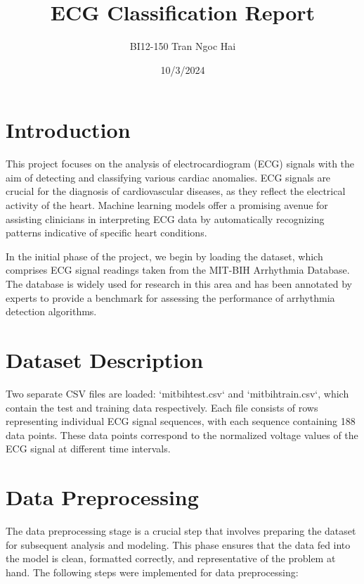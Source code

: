 \documentclass{report}
\title{ECG Classification Report}
\author{BI12-150 Tran Ngoc Hai}
\date{10/3/2024}
\begin{document}

\section{Introduction}

This project focuses on the analysis of electrocardiogram (ECG) signals with the aim of detecting and classifying various cardiac anomalies. ECG signals are crucial for the diagnosis of cardiovascular diseases, as they reflect the electrical activity of the heart. Machine learning models offer a promising avenue for assisting clinicians in interpreting ECG data by automatically recognizing patterns indicative of specific heart conditions.

In the initial phase of the project, we begin by loading the dataset, which comprises ECG signal readings taken from the MIT-BIH Arrhythmia Database. The database is widely used for research in this area and has been annotated by experts to provide a benchmark for assessing the performance of arrhythmia detection algorithms.


\section{Dataset Description}

 Two separate CSV files are loaded: `mitbihtest.csv` and `mitbihtrain.csv`, which contain the test and training data respectively. Each file consists of rows representing individual ECG signal sequences, with each sequence containing 188 data points. These data points correspond to the normalized voltage values of the ECG signal at different time intervals. 

\section{Data Preprocessing}
 
The data preprocessing stage is a crucial step that involves preparing the dataset for subsequent analysis and modeling. This phase ensures that the data fed into the model is clean, formatted correctly, and representative of the problem at hand. The following steps were implemented for data preprocessing:
\end{document}
